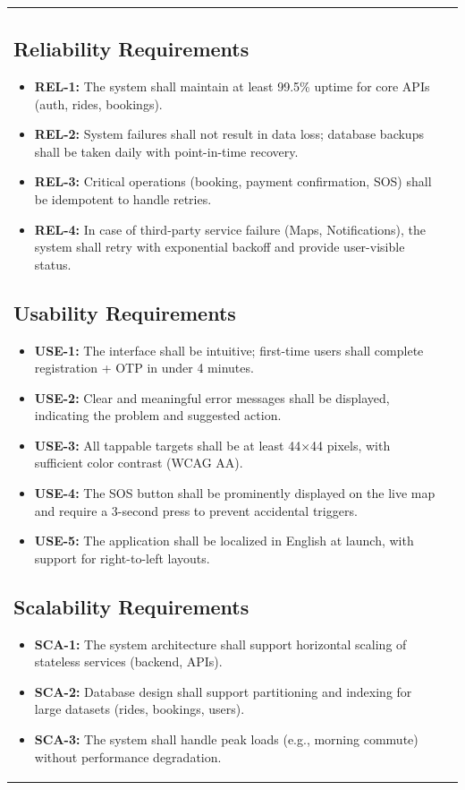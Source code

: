 \begin{longtable}{|>{\raggedright\arraybackslash}p{4cm}|>{\raggedright\arraybackslash}p{11cm}|}
\subsection{Reliability Requirements}
\begin{itemize}
\item \textbf{REL-1:} The system shall maintain at least 99.5\% uptime for core APIs (auth, rides, bookings).
\item \textbf{REL-2:} System failures shall not result in data loss; database backups shall be taken daily with point-in-time recovery.
\item \textbf{REL-3:} Critical operations (booking, payment confirmation, SOS) shall be idempotent to handle retries.
\item \textbf{REL-4:} In case of third-party service failure (Maps, Notifications), the system shall retry with exponential backoff and provide user-visible status.
\end{itemize}

\subsection{Usability Requirements}
\begin{itemize}
\item \textbf{USE-1:} The interface shall be intuitive; first-time users shall complete registration + OTP in under 4 minutes.
\item \textbf{USE-2:} Clear and meaningful error messages shall be displayed, indicating the problem and suggested action.
\item \textbf{USE-3:} All tappable targets shall be at least 44×44 pixels, with sufficient color contrast (WCAG AA).
\item \textbf{USE-4:} The SOS button shall be prominently displayed on the live map and require a 3-second press to prevent accidental triggers.
\item \textbf{USE-5:} The application shall be localized in English at launch, with support for right-to-left layouts.
\end{itemize}

\subsection{Scalability Requirements}
\begin{itemize}
\item \textbf{SCA-1:} The system architecture shall support horizontal scaling of stateless services (backend, APIs).
\item \textbf{SCA-2:} Database design shall support partitioning and indexing for large datasets (rides, bookings, users).
\item \textbf{SCA-3:} The system shall handle peak loads (e.g., morning commute) without performance degradation.
\end{itemize}


\end{longtable}
